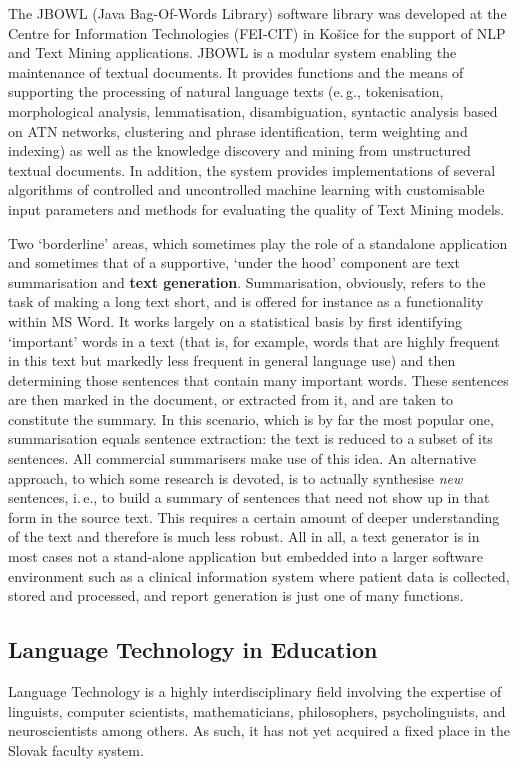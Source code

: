 \begin{multicols}{2}
The JBOWL (Java Bag-Of-Words Library) software library was developed at the Centre for Information Technologies (FEI-CIT) in Košice for the support of NLP and Text Mining applications. JBOWL is a modular system enabling the maintenance of textual documents. It provides functions and the means of supporting the processing of natural language texts (e.\,g., tokenisation, morphological analysis, lemmatisation, disambiguation, syntactic analysis based on ATN networks, clustering and phrase identification, term weighting and indexing) as well as the knowledge discovery and mining from unstructured textual documents. In addition, the system provides implementations of several algorithms of controlled and uncontrolled machine learning with customisable input parameters and methods for evaluating the quality of Text Mining models.

Two ‘borderline’ areas, which sometimes play the role of a standalone application and sometimes that of a supportive, ‘under the hood’ component are text summarisation and \textbf{text generation}. Summarisation, obviously, refers to the task of making a long text short, and is offered for instance as a functionality within MS Word. It works largely on a statistical basis by first identifying ‘important’ words in a text (that is, for example, words that are highly frequent in this text but markedly less frequent in general language use) and then determining those sentences that contain many important words. These sentences are then marked in the document, or extracted from it, and are taken to constitute the summary. In this scenario, which is by far the most popular one, summarisation equals sentence extraction: the text is reduced to a subset of its sentences. All commercial summarisers make use of this idea. An alternative approach, to which some research is devoted, is to actually synthesise \emph{new} sentences, i.\,e., to build a summary of sentences that need not show up in that form in the source text. This requires a certain amount of deeper understanding of the text and therefore is much less robust. All in all, a text generator is in most cases not a stand-alone application but embedded into a larger software environment such as a clinical information system where patient data is collected, stored and processed, and report generation is just one of many functions.


\subsection{Language Technology in Education}
Language Technology is a highly interdisciplinary field involving the expertise of linguists, computer scientists, mathematicians, philosophers, psycholinguists, and neuroscientists among others. As such, it has not yet acquired a fixed place in the Slovak faculty system.


\end{multicols}
